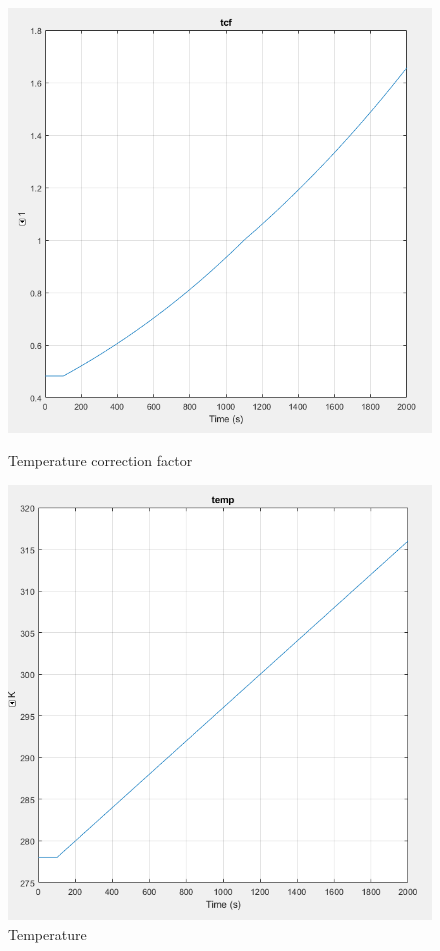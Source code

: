 \begin{figure}[h]
\centering
\begin{minipage}{.5\textwidth}
    \centering
    \includegraphics[width=\textwidth]{tcf.PNG}
    \caption{Temperature correction factor}
    \label{fig:tcf}
\end{minipage}
\begin{minipage}{.5\textwidth}
  \centering
  \includegraphics[width=\linewidth]{temp.PNG}
  \caption{Temperature}
  \label{fig:temp}
\end{minipage}
\end{figure}
